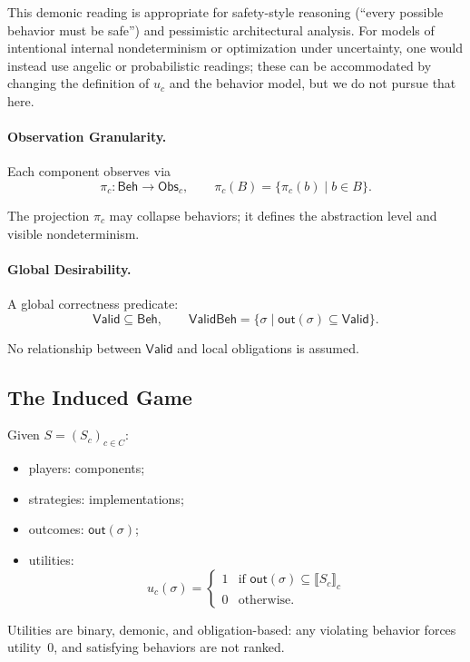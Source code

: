 This demonic reading is appropriate for safety-style reasoning (``every possible behavior must be safe'') and pessimistic architectural analysis. For models of intentional internal nondeterminism or optimization under uncertainty, one would instead use angelic or probabilistic readings; these can be accommodated by changing the definition of $u_c$ and the behavior model, but we do not pursue that here.

\paragraph{Observation Granularity.}

Each component observes via
\[
\pi_c : \mathsf{Beh} \to \mathsf{Obs}_c,
\qquad
\pi_c(B) = \{\pi_c(b) \mid b \in B\}.
\]

The projection $\pi_c$ may collapse behaviors; it defines the abstraction level and visible nondeterminism.

\paragraph{Global Desirability.}

A global correctness predicate:
\[
\mathsf{Valid} \subseteq \mathsf{Beh},
\qquad
\mathsf{ValidBeh} = \{\sigma \mid \mathsf{out}(\sigma) \subseteq \mathsf{Valid}\}.
\]

No relationship between $\mathsf{Valid}$ and local obligations is assumed.

\subsection{The Induced Game}

Given $S=(S_c)_{c\in C}$:

\begin{itemize}
\item players: components;
\item strategies: implementations;
\item outcomes: $\mathsf{out}(\sigma)$;
\item utilities:
\[
u_c(\sigma)=
\begin{cases}
1 & \text{if }\mathsf{out}(\sigma)\subseteq\llbracket S_c\rrbracket_c\\
0 & \text{otherwise.}
\end{cases}
\]
\end{itemize}

Utilities are binary, demonic, and obligation-based: any violating behavior forces utility~0, and satisfying behaviors are not ranked.

